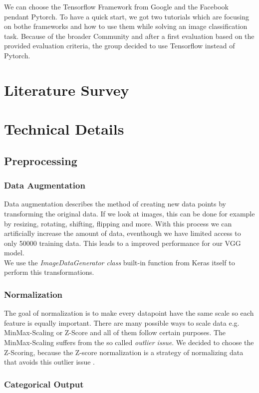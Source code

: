\documentclass[journal]{IEEEtran}
\begin{document}
\noindent We can choose the Tensorflow Framework from Google and the Facebook pendant Pytorch. To have a quick start, we got two tutorials which are focusing on bothe frameworks and how to use them while solving an image classification task. Because of the broader Community and after a first evaluation based on the provided evaluation criteria, the group decided to use Tensorflow instead of Pytorch.
\section{Literature Survey}
%
%
\section{Technical Details}
\subsection{Preprocessing}
\subsubsection{Data Augmentation}
Data augmentation describes the method of creating new data points by transforming the original data. If we look at images, this can be done for example by resizing, rotating, shifting, flipping and more.
With this process we can artificially increase the amount of data, eventhough we have limited access to only 50000 training data. 
This leads to a improved performance for our VGG model. \\
We use the \textit{ImageDataGenerator class} built-in function from Keras itself to perform this transformations.

\subsubsection{Normalization}
The goal of normalization is to make every datapoint have the same scale so each feature is equally important. There are many possible ways to scale data e.g. MinMax-Scaling or Z-Score and all of them follow certain purposes. 
The MinMax-Scaling suffers from the so called \textit{outlier issue}.
We decided to choose the Z-Scoring, because the Z-score normalization is a strategy of normalizing data that avoids this outlier issue \cite{RN6}.  

\subsubsection{Categorical Output}
\end{document}
